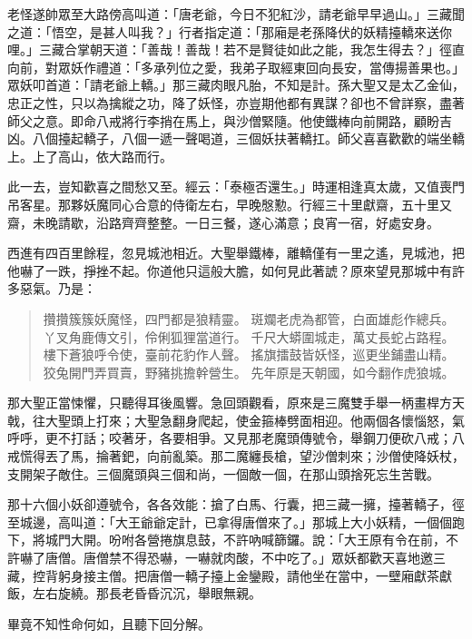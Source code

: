 老怪遂帥眾至大路傍高叫道：「唐老爺，今日不犯紅沙，請老爺早早過山。」三藏聞之道：「悟空，是甚人叫我？」行者指定道：「那廂是老孫降伏的妖精擡轎來送你哩。」三藏合掌朝天道：「善哉！善哉！若不是賢徒如此之能，我怎生得去？」徑直向前，對眾妖作禮道：「多承列位之愛，我弟子取經東回向長安，當傳揚善果也。」眾妖叩首道：「請老爺上轎。」那三藏肉眼凡胎，不知是計。孫大聖又是太乙金仙，忠正之性，只以為擒縱之功，降了妖怪，亦豈期他都有異謀？卻也不曾詳察，盡著師父之意。即命八戒將行李捎在馬上，與沙僧緊隨。他使鐵棒向前開路，顧盼吉凶。八個擡起轎子，八個一遞一聲喝道，三個妖扶著轎扛。師父喜喜歡歡的端坐轎上。上了高山，依大路而行。

此一去，豈知歡喜之間愁又至。經云：「泰極否還生。」時運相逢真太歲，又值喪門吊客星。那夥妖魔同心合意的侍衛左右，早晚慇懃。行經三十里獻齋，五十里又齋，未晚請歇，沿路齊齊整整。一日三餐，遂心滿意；良宵一宿，好處安身。

西進有四百里餘程，忽見城池相近。大聖舉鐵棒，離轎僅有一里之遙，見城池，把他嚇了一跌，掙挫不起。你道他只這般大膽，如何見此著諕？原來望見那城中有許多惡氣。乃是：
\begin{quote}
攢攢簇簇妖魔怪，四門都是狼精靈。
斑斕老虎為都管，白面雄彪作總兵。
丫叉角鹿傳文引，伶俐狐狸當道行。
千尺大蟒圍城走，萬丈長蛇占路程。
樓下蒼狼呼令使，臺前花豹作人聲。
搖旗擂鼓皆妖怪，巡更坐鋪盡山精。
狡兔開門弄買賣，野豬挑擔幹營生。
先年原是天朝國，如今翻作虎狼城。
\end{quote}

那大聖正當悚懼，只聽得耳後風響。急回頭觀看，原來是三魔雙手舉一柄畫桿方天戟，往大聖頭上打來；大聖急翻身爬起，使金箍棒劈面相迎。他兩個各懷惱怒，氣呼呼，更不打話；咬著牙，各要相爭。又見那老魔頭傳號令，舉鋼刀便砍八戒；八戒慌得丟了馬，掄著鈀，向前亂築。那二魔纏長槍，望沙僧刺來；沙僧使降妖杖，支開架子敵住。三個魔頭與三個和尚，一個敵一個，在那山頭捨死忘生苦戰。

那十六個小妖卻遵號令，各各效能：搶了白馬、行囊，把三藏一擁，擡著轎子，徑至城邊，高叫道：「大王爺爺定計，已拿得唐僧來了。」那城上大小妖精，一個個跑下，將城門大開。吩咐各營捲旗息鼓，不許吶喊篩鑼。說：「大王原有令在前，不許嚇了唐僧。唐僧禁不得恐嚇，一嚇就肉酸，不中吃了。」眾妖都歡天喜地邀三藏，控背躬身接主僧。把唐僧一轎子擡上金鑾殿，請他坐在當中，一壁廂獻茶獻飯，左右旋繞。那長老昏昏沉沉，舉眼無親。

畢竟不知性命何如，且聽下回分解。
